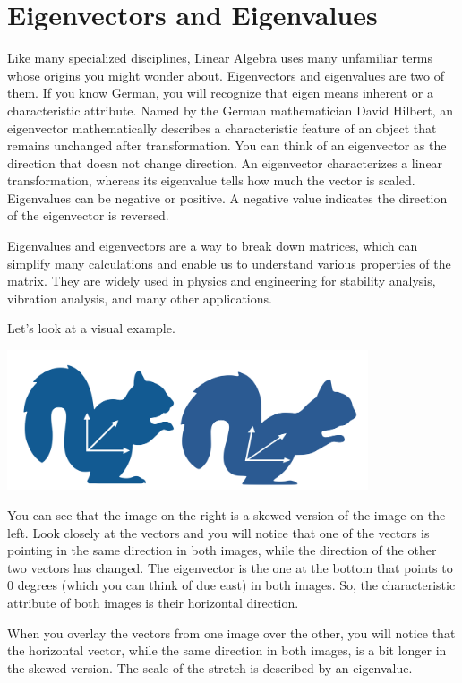 \chapter{Eigenvectors and Eigenvalues}


Like many specialized disciplines, Linear Algebra uses many unfamiliar terms whose origins you might wonder about. Eigenvectors and eigenvalues are two of them. If you know German, you will recognize that eigen means inherent or a characteristic attribute. Named by the German mathematician David Hilbert, an eigenvector mathematically describes a characteristic feature of an object that remains unchanged after transformation. You can think of an eigenvector as the direction that doesn not change direction. An eigenvector characterizes a linear transformation, whereas its eigenvalue tells how much the vector is scaled. Eigenvalues can be negative or positive. A negative value indicates the direction of the eigenvector is reversed.

Eigenvalues and eigenvectors are a way to break down matrices, which can simplify many calculations and enable us to understand various properties of the matrix. They are widely used in physics and engineering for stability analysis, vibration analysis, and many other applications.  

Let’s look at a visual example.

\includegraphics[width=0.8\textwidth]{eigensquirrel.png}

You can see that the  image on the right is a skewed version of the image on the left. Look closely at the vectors and you will notice that one of the vectors is pointing in the same direction in both images, while the direction of the other two vectors has changed. The eigenvector is the one at the bottom that points to 0 degrees (which you can think of due east) in both images. So, the characteristic attribute of both images is their horizontal direction.

When you overlay the vectors from one image over the other, you will notice that the horizontal vector, while the same direction in both images, is a bit longer in the skewed version. The scale of the stretch is described by an eigenvalue.

